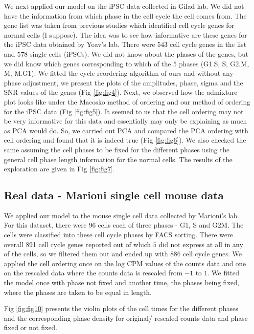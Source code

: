 \documentclass[11pt]{article}
\begin{document}
We next applied our model on the iPSC data collected in Gilad lab. We did not have the information from which phase in the cell cycle the cell comes from. The gene list was taken from previous studies which identified cell cycle genes for normal cells (I suppose). The idea was to see how informative are these genes for the iPSC data obtained by Yoav's lab. There were $543$ cell cycle genes in the list and $578$ single cells (iPSCs).  We did not know about the phases of the genes, but we did know which genes corresponding to which of the $5$ phases (G1.S, S, G2.M, M, M.G1).  We fitted the cycle reordering algorithm of ours and without any phase adjustment, we present the plots of the amplitudes, phase, sigma and the SNR values of the genes (Fig \ref{fig:fig4}). Next, we observed how the admixture plot looks like under the Macosko method of ordering and our method of ordering for the iPSC data (Fig \ref{fig:fig5}).  It seemed to us that the cell ordering may not be very informative for this data and essentially may only be explaining as much as PCA would do. So, we carried out PCA and compared the PCA ordering with cell ordering and found that it is indeed true (Fig \ref{fig:fig6}). We also checked the same assuming the cell phases to be fixed for the different phases using the general cell phase length information for the normal cells. The results of the exploration are given in Fig \ref{fig:fig7}.

\subsection{Real data - Marioni single cell mouse data}

We applied our model to the mouse single cell data collected by Marioni's lab. For this dataset, there were $96$ cells each of three phases - G1, S and G2M. The cells were classified into these cell cycle phases by FACS sorting. There were overall 891 cell cycle genes reported out of which $5$ did not express at all in any of the cells, so we filtered them out and ended up with $886$ cell cycle genes. We applied the cell ordering once on the log CPM values of the counts data and one on the rescaled data where the counts data is rescaled from $-1$ to $1$. We fitted the model once with phase not fixed and another time, the phases being fixed, where the phases are taken to be equal in length.

Fig \ref{fig:fig10} presents the violin plots of the cell times for the different phases and the corresponding phase density for original/ rescaled counts data and phase fixed or not fixed.
\end{document}
